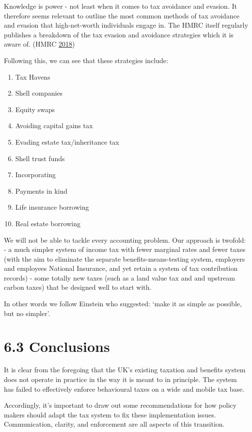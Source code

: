 \documentclass[]{tufte-handout}
\providecommand{\tightlist}{%
  \setlength{\itemsep}{0pt}\setlength{\parskip}{0pt}}
\begin{document}
Knowledge is power - not least when it comes to tax avoidance and
evasion. It therefore seems relevant to outline the most common methods
of tax avoidance and evasion that high-net-worth individuals engage in.
The HMRC itself regularly publishes a breakdown of the tax evasion and
avoidance strategies which it is aware of. (HMRC
\protect\hyperlink{ref-HMRC2018b}{2018})

Following this, we can see that these strategies include:

\begin{enumerate}
\def\labelenumi{\arabic{enumi})}
\tightlist
\item
  Tax Havens
\item
  Shell companies
\item
  Equity swaps
\item
  Avoiding capital gains tax
\item
  Evading estate tax/inheritance tax
\item
  Shell trust funds
\item
  Incorporating
\item
  Payments in kind
\item
  Life insurance borrowing
\item
  Real estate borrowing
\end{enumerate}

We will not be able to tackle every accounting problem. Our approach is
twofold: - a much simpler system of income tax with fewer marginal rates
and fewer taxes (with the aim to eliminate the separate
benefits-means-testing system, employers and employees National
Insurance, and yet retain a system of tax contribution records) - some
totally new taxes (such as a land value tax and and upstream carbon
taxes) that be designed well to start with.

In other words we follow Einstein who suggested: `make it as simple as
possible, but no simpler'.

\hypertarget{conclusions-1}{%
\section{6.3 Conclusions}\label{conclusions-1}}

It is clear from the foregoing that the UK's existing taxation and
benefits system does not operate in practice in the way it is meant to
in principle. The system has failed to effectively enforce behavioural
taxes on a wide and mobile tax base.

Accordingly, it's important to draw out some recommendations for how
policy makers should adapt the tax system to fix these implementation
issues. Communication, clarity, and enforcement are all aspects of this
transition.
\end{document}
